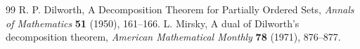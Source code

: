 \documentclass[10pt,a4paper]{article}
\begin{document}
\begin{thebibliography}{99}
 R. P.  Dilworth, A Decomposition Theorem for Partially Ordered Sets, {\em Annals of Mathematics} {\bf 51} (1950), 161--166.
 L. Mirsky, A dual of Dilworth's decomposition theorem, {\em American Mathematical Monthly} {\bf 78} (1971), 876--877.
\end{thebibliography}
\end{document}
